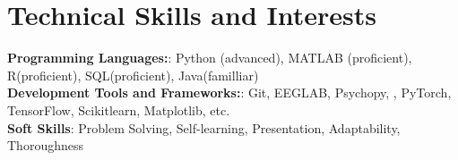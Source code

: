 \documentclass[a4paper,11pt]{article}
\makeatletter
\newcommand{\resumeSubheading}[4]{
\vspace{0.5mm}\item
    \begin{tabular*}{0.98\textwidth}[t]{l@{\extracolsep{\fill}}r}
        \textbf{#1} & \textit{\footnotesize{#4}} \\
        \textit{\footnotesize{#3}} &  \footnotesize{#2}\\
    \end{tabular*}
    \vspace{-2.4mm}
}
\newcommand{\resumeSubHeadingListStart}{\begin{itemize}[leftmargin=*,labelsep=0mm]}
\newcommand{\resumeItemListStart}{\begin{justify}\begin{itemize}[leftmargin=3ex, rightmargin=2ex, noitemsep,labelsep=1.2mm,itemsep=0mm]\small}
\newcommand{\resumeSubHeadingListEnd}{\end{itemize}\vspace{2mm}}
\newcommand{\resumeItemListEnd}{\end{itemize}\end{justify}\vspace{-2mm}}
\makeatother
\begin{document}


\vspace{-5.5mm}

\section{\textbf{Technical Skills and Interests}}
 \begin{itemize}[leftmargin=0.05in, label={}]
    \small{\item{
    \textbf{Programming Languages:}{: Python (advanced), MATLAB (proficient), R(proficient), SQL(proficient), Java(familliar)} \\
    \textbf{Development Tools and Frameworks:}{: Git, EEGLAB, Psychopy, , PyTorch, TensorFlow, Scikitlearn, Matplotlib, etc.} \\
     \textbf{Soft Skills}{: Problem Solving, Self-learning, Presentation, Adaptability, Thoroughness} \\
    }}
 \end{itemize}
 \vspace{-5.5mm}
\end{document}
